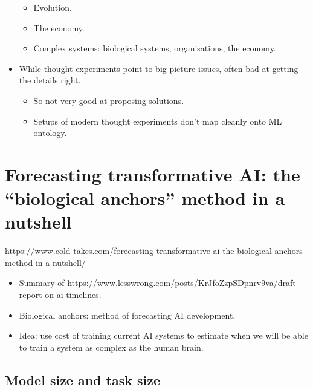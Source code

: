 \begin{itemize}
\begin{itemize}
        \item Evolution.
        \item The economy.
        \item Complex systems: biological systems, organisations, the economy.
    \end{itemize}
    \item While thought experiments point to big-picture issues, often bad at getting the details right.
    \begin{itemize}
        \item So not very good at proposing solutions.
        \item Setups of modern thought experiments don't map cleanly onto ML ontology.
    \end{itemize}
\end{itemize}


\section{Forecasting transformative AI: the ``biological anchors'' method in a nutshell}

\url{https://www.cold-takes.com/forecasting-transformative-ai-the-biological-anchors-method-in-a-nutshell/}

\begin{itemize}
    \item Summary of \url{https://www.lesswrong.com/posts/KrJfoZzpSDpnrv9va/draft-report-on-ai-timelines}.
    \item Biological anchors: method of forecasting AI development.
    \item Idea: use cost of training current AI systems to estimate when we will be able to train a system as complex as the human brain.
\end{itemize}


\subsection{Model size and task size}

